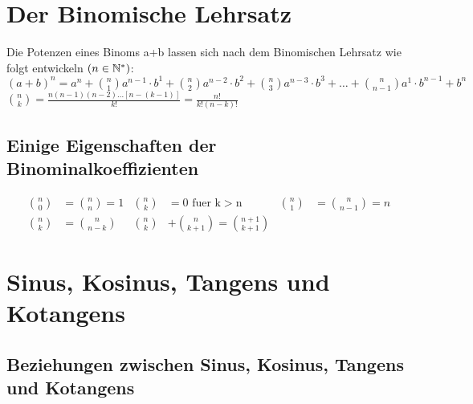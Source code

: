 	\vspace{10mm}
	\section{Der Binomische Lehrsatz}
	
			
		Die Potenzen eines Binoms a+b lassen sich nach dem Binomischen Lehrsatz 
		\newline 
		wie folgt entwickeln \( \left(n \in \mathbb{N}^* \right)\):
		\vspace{5mm}
		\newline
		\( \left( a + b \right)^n = a^n + \binom{n}{1} a^{n-1} \cdot b^1 + \binom{n}{2} a^{n-2} \cdot b^2 + \binom{n}{3} a^{n-3} \cdot b^3 + 
		\ldots + \binom{n}{n-1} a^{1} \cdot b^{n-1} + b^n \)
		\vspace{5mm}
		\newline
		\vspace{5mm}
		\newline
		\( \binom{n}{k} = \frac{n \left( n - 1 \right) \left( n - 2 \right) \ldots \left[ n - \left( k - 1 \right) \right]}{k!} = \frac{n!}{k! \left( n - k \right) !} \)
	
	\vspace{10mm}
	\subsection*{Einige Eigenschaften der Binominalkoeffizienten}
		
		
			\begin{align*}
				\binom{n}{0} &= \binom{n}{n} = 1 & \binom{n}{k} &= 0 \text{ fuer k} > \text{n} & \binom{n}{1} &= \binom{n}{n-1} = n
				\\
				\binom{n}{k} &= \binom{n}{n-k} & \binom{n}{k} &+ \binom{n}{k+1} = \binom{n+1}{k+1}
			\end{align*}
			
	\vspace{10mm}
	\section{Sinus, Kosinus, Tangens und Kotangens}
	
	\vspace{10mm}
	\subsection{Beziehungen zwischen Sinus, Kosinus, Tangens und Kotangens}
	

